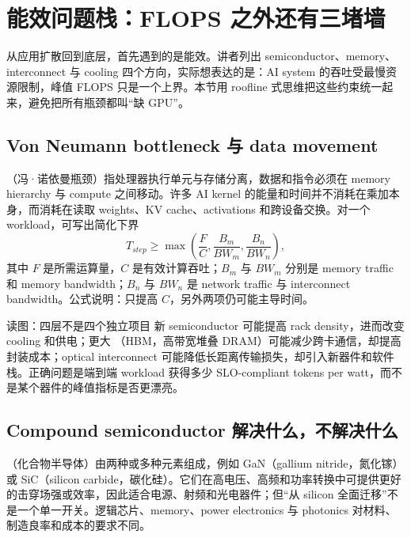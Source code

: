 \section{能效问题栈：FLOPS 之外还有三堵墙}

从应用扩散回到底层，首先遇到的是能效。讲者列出 semiconductor、memory、interconnect 与 cooling 四个方向，实际想表达的是：AI system 的吞吐受最慢资源限制，峰值 FLOPS 只是一个上界。本节用 roofline 式思维把这些约束统一起来，避免把所有瓶颈都叫“缺 GPU”。

\subsection{Von Neumann bottleneck 与 data movement}

（冯·诺依曼瓶颈）指处理器执行单元与存储分离，数据和指令必须在 memory hierarchy 与 compute 之间移动。许多 AI kernel 的能量和时间并不消耗在乘加本身，而消耗在读取 weights、KV cache、activations 和跨设备交换。对一个 workload，可写出简化下界
\[
T_{step}\geq \max\left(\frac{F}{C},\frac{B_m}{BW_m},\frac{B_n}{BW_n}\right),
\]
其中 $F$ 是所需运算量，$C$ 是有效计算吞吐；$B_m$ 与 $BW_m$ 分别是 memory traffic 和 memory bandwidth；$B_n$ 与 $BW_n$ 是 network traffic 与 interconnect bandwidth。公式说明：只提高 $C$，另外两项仍可能主导时间。


\begin{knowledgebox}{读图：四层不是四个独立项目}
新 semiconductor 可能提高 rack density，进而改变 cooling 和供电；更大 （HBM，高带宽堆叠 DRAM）可能减少跨卡通信，却提高封装成本；optical interconnect 可能降低长距离传输损失，却引入新器件和软件栈。正确问题是端到端 workload 获得多少 SLO-compliant tokens per watt，而不是某个器件的峰值指标是否更漂亮。
\end{knowledgebox}

\subsection{Compound semiconductor 解决什么，不解决什么}

（化合物半导体）由两种或多种元素组成，例如 GaN（gallium nitride，氮化镓）或 SiC（silicon carbide，碳化硅）。它们在高电压、高频和功率转换中可提供更好的击穿场强或效率，因此适合电源、射频和光电器件；但“从 silicon 全面迁移”不是一个单一开关。逻辑芯片、memory、power electronics 与 photonics 对材料、制造良率和成本的要求不同。

